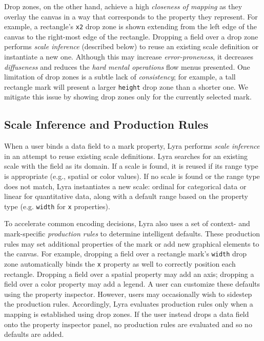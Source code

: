 Drop zones, on the other hand, achieve a high \emph{closeness of mapping} as
they overlay the canvas in a way that corresponds to the property they
represent. For example, a rectangle's \texttt{x2} drop zone is shown extending
from the left edge of the canvas to the right-most edge of the rectangle.
Dropping a field over a drop zone performs \emph{scale inference} (described
below) to reuse an existing scale definition or instantiate a new one. Although
this may increase \emph{error-proneness}, it decreases \emph{diffuseness} and
reduces the \emph{hard mental operations} flow menus presented. One limitation
of drop zones is a subtle lack of \emph{consistency}; for example, a tall
rectangle mark will present a larger \texttt{height} drop zone than a shorter
one. We mitigate this issue by showing drop zones only for the currently
selected mark.

\subsection{Scale Inference and Production Rules}

When a user binds a data field to a mark property, Lyra performs \emph{scale
inference} in an attempt to reuse existing scale definitions. Lyra searches for
an existing scale with the field as its domain. If a scale is found, it is
reused if its range type is appropriate (e.g., spatial or color values). If no
scale is found or the range type does not match, Lyra instantiates a new scale:
ordinal for categorical data or linear for quantitative data, along with a
default range based on the property type (e.g. \texttt{width} for \texttt{x}
properties).

To accelerate common encoding decisions, Lyra also uses a set of context- and
mark-specific \emph{production rules} to determine intelligent defaults. These
production rules may set additional properties of the mark or add new graphical
elements to the canvas. For example, dropping a field over a rectangle mark's
\texttt{width} drop zone automatically binds the \texttt{x} property as well to
correctly position each rectangle. Dropping a field over a spatial property may
add an axis; dropping a field over a color property may add a legend. A user can
customize these defaults using the property inspector. However, users may
occasionally wish to sidestep the production rules. Accordingly, Lyra evaluates
production rules only when a mapping is established using drop zones. If the
user instead drops a data field onto the property inspector panel, no production
rules are evaluated and so no defaults are added.

